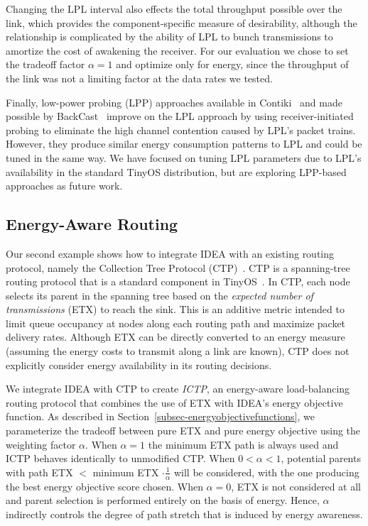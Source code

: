 Changing the LPL interval also effects the total throughput possible over the
link, which provides the component-specific measure of desirability, although
the relationship is complicated by the ability of LPL to bunch transmissions
to amortize the cost of awakening the receiver. For our evaluation we chose
to set the tradeoff factor $\alpha=1$ and optimize only for energy, since the
throughput of the link was not a limiting factor at the data rates we tested.

Finally, low-power probing (LPP) approaches available in
Contiki~\cite{contiki} and made possible by BackCast~\cite{backcast-hotnets}
improve on the LPL approach by using receiver-initiated probing to eliminate
the high channel contention caused by LPL's packet trains. However, they
produce similar energy consumption patterns to LPL and could be tuned in the
same way. We have focused on tuning LPL parameters due to LPL's availability
in the standard TinyOS distribution, but are exploring LPP-based approaches
as future work.

\subsection{Energy-Aware Routing}

Our second example shows how to integrate IDEA with an existing routing
protocol, namely the Collection Tree Protocol (CTP)~\cite{ctp-sensys09}. CTP
is a spanning-tree routing protocol that is a standard component in
TinyOS~\cite{tinyos-asplos00}.  In CTP, each node selects its parent in the
spanning tree based on the {\em expected number of transmissions} (ETX) to
reach the sink. This is an additive metric intended to limit queue occupancy
at nodes along each routing path and maximize packet delivery rates. Although
ETX can be directly converted to an energy measure (assuming the energy costs
to transmit along a link are known), CTP does not explicitly consider energy
availability in its routing decisions.

We integrate IDEA with CTP to create {\em ICTP}, an energy-aware
load-balancing routing protocol that combines the use of ETX with IDEA's
energy objective function.  As described in
Section~\ref{subsec-energyobjectivefunctions}, we parameterize the tradeoff
between pure ETX and pure energy objective using the weighting factor
$\alpha$.  When $\alpha = 1$ the minimum ETX path is always used and ICTP
behaves identically to unmodified CTP. When $0 < \alpha < 1$, potential
parents with path ETX $<$ minimum ETX $\cdot \frac{1}{\alpha}$ will be
considered, with the one producing the best energy objective score chosen.
When $\alpha = 0$, ETX is not considered at all and parent selection is
performed entirely on the basis of energy.  Hence, $\alpha$ indirectly
controls the degree of path stretch that is induced by energy awareness. 

